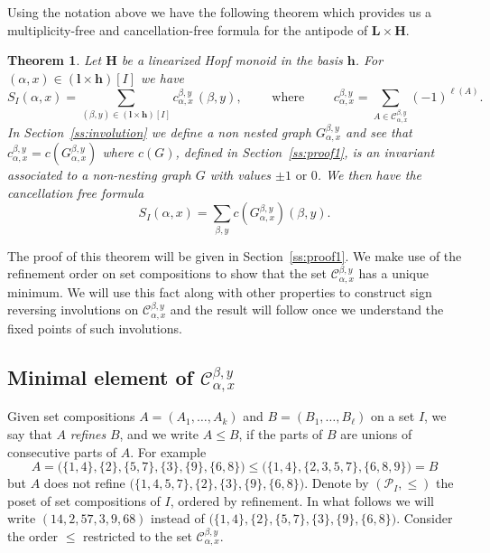 \documentclass[10pt]{amsart}
\newtheorem{theorem}{Theorem}[section]
\theoremstyle{definition}
\newcommand{\bL}{\mathbf{L}}
\newcommand{\bH}{\mathbf{H}}
\newcommand{\bh}{\mathbf{h}}
\begin{document}
Using the notation above we have the following theorem which provides us a multiplicity-free and cancellation-free formula for the antipode of $\bL\times\bH$. 
\begin{theorem}\label{thm:antiLxP} Let $\bH$ be a linearized Hopf monoid in the basis $\mathbf{h}$. For $(\alpha, x)\in(\mathbf{l}\times\bh)[I]$ we have
$$ S_I(\alpha,x) = \sum_{(\beta,y)\in (\mathbf{l}\times\bh)[I]} c_{\alpha,x}^{\beta,y} \,(\beta,y),
\qquad\text{ where }\qquad
 c_{\alpha,x}^{\beta,y}=\sum_{A\in \mathcal{C}_{\alpha,x}^{\beta,y}} (-1)^{\ell(A)}.$$
 In Section~\ref{ss:involution} we define a non nested graph $G_{\alpha,x}^{\beta,y}$ and see that $c_{\alpha,x}^{\beta,y}=c(G_{\alpha,x}^{\beta,y})$ where $c(G)$, defined in Section~\ref{ss:proof1}, is an invariant associated to a non-nesting graph $G$
 with values $\pm1 \text{ or } 0$. We then have the cancellation free formula
 \begin{equation}\label{eq:thm1}
 S_I(\alpha,x) = \sum_{\beta, y} c(G_{\alpha,x}^{\beta,y}) (\beta,y).
\end{equation}
\end{theorem}

The proof of this theorem will be given in Section~\ref{ss:proof1}. We make use of the refinement order on set compositions to show that the set $\mathcal{C}_{\alpha,x}^{\beta,y}$ has a unique minimum. We will use this fact along with other properties to construct sign reversing involutions on $\mathcal{C}_{\alpha,x}^{\beta,y}$ and the result will follow once we understand the fixed points of such involutions.

\subsection{Minimal element of \texorpdfstring{$\mathcal{C}_{\alpha,x}^{\beta,y}$}{C alpha,x beta,y}}\label{ss:refinementonC}
Given set compositions $A=(A_1,\ldots,A_k)$ and $B=(B_1,\ldots,B_\ell)$ on a set $I$, 
we say that $A$ \emph{refines} $B$, and we write $A\le B$, if the parts of $B$ are unions of consecutive parts of $A$. For example
 $$A = \big(\{1,4\},\{2\},\{5,7\},\{3\},\{9\},\{6,8\}\big) \le \big(\{1,4\},\{2,3,5,7\},\{6,8,9\}\big)=B$$
but $A$ does not refine $\big(\{1,4,5,7\},\{2\},\{3\},\{9\},\{6,8\}\big)$. Denote by $(\mathcal{P}_I,\leq)$ the poset of set compositions of $I$, ordered by refinement.
In what follows we will write $(14,2,57,3,9,68)$ instead of $\big(\{1,4\},\{2\},\{5,7\},\{3\},\{9\},\{6,8\}\big)$. Consider the order $\le$ restricted to the set $\mathcal{C}_{\alpha,x}^{\beta,y}$.
\end{document}
